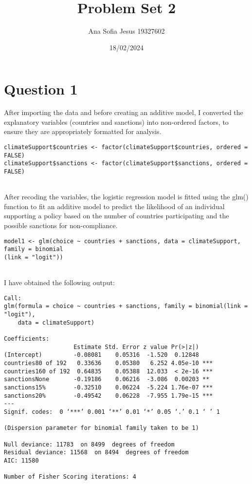 \documentclass[oneside]{article}
\title{Problem Set 2}
\author{Ana Sofia Jesus 19327602}
\date{18/02/2024}
\begin{document}
\maketitle

\section*{Question 1}
After importing the data and before creating an additive model, I converted the explanatory variables (countries and sanctions) into non-ordered factors, to ensure they are appropriately formatted for analysis.
\begin{verbatim}
climateSupport$countries <- factor(climateSupport$countries, ordered = FALSE)
climateSupport$sanctions <- factor(climateSupport$sanctions, ordered = FALSE)
\end{verbatim}
\\
After recoding the variables, the logistic regression model is fitted using the glm() function to fit an additive model to predict the likelihood of an individual supporting a policy based on the number of countries participating and the possible sanctions for non-compliance.
\begin{verbatim}
model1 <- glm(choice ~ countries + sanctions, data = climateSupport, family = binomial
(link = "logit"))    
\end{verbatim}
\\
I have obtained the following output:
\begin{verbatim}
Call:
glm(formula = choice ~ countries + sanctions, family = binomial(link = "logit"), 
    data = climateSupport)

Coefficients:
                    Estimate Std. Error z value Pr(>|z|)    
(Intercept)         -0.08081    0.05316  -1.520  0.12848    
countries80 of 192   0.33636    0.05380   6.252 4.05e-10 ***
countries160 of 192  0.64835    0.05388  12.033  < 2e-16 ***
sanctionsNone       -0.19186    0.06216  -3.086  0.00203 ** 
sanctions15%        -0.32510    0.06224  -5.224 1.76e-07 ***
sanctions20%        -0.49542    0.06228  -7.955 1.79e-15 ***
---
Signif. codes:  0 ‘***’ 0.001 ‘**’ 0.01 ‘*’ 0.05 ‘.’ 0.1 ‘ ’ 1

(Dispersion parameter for binomial family taken to be 1)

Null deviance: 11783  on 8499  degrees of freedom
Residual deviance: 11568  on 8494  degrees of freedom
AIC: 11580

Number of Fisher Scoring iterations: 4
\end{verbatim}
\end{document}
